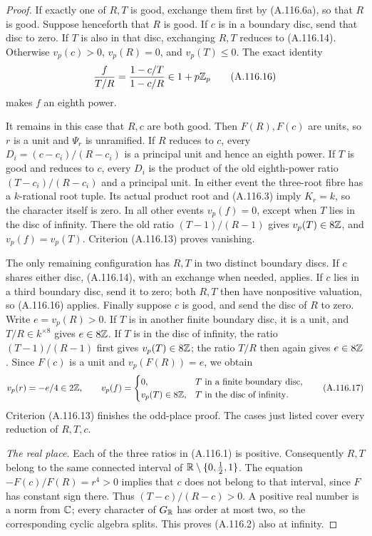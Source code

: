 \begin{proof}
If exactly one of $R,T$ is good, exchange them first
by (A.116.6a), so that $R$ is good.
Suppose henceforth that $R$ is good.
If $c$ is in a boundary disc, send that disc to zero.
If $T$ is also in that disc, exchanging $R,T$
reduces to (A.116.14).
Otherwise $v_p(c)>0$, $v_p(R)=0$, and $v_p(T)\le0$.
The exact identity
\[
                  \frac{f}{T/R}
                   =\frac{1-c/T}{1-c/R}\in1+p\mathbb Z_p
\tag{A.116.16}
\]
makes $f$ an eighth power.

It remains in this case that $R,c$ are both good.
Then $F(R),F(c)$ are units, so $r$ is a unit and
$\Psi_r$ is unramified.
If $R$ reduces to $c$, every
$D_i=(c-c_i)/(R-c_i)$ is a principal unit and hence
an eighth power.
If $T$ is good and reduces to $c$, every $D_i$ is
the product of the old eighth-power ratio
$(T-c_i)/(R-c_i)$ and a principal unit.
In either event the three-root fibre has a
$k$-rational root tuple.
Its actual product root and (A.116.3) imply
$K_r=k$, so the character itself is zero.
In all other events $v_p(f)=0$, except when $T$
lies in the disc of infinity.
There the old ratio $(T-1)/(R-1)$ gives
$v_p(T)\in8\mathbb Z$, and $v_p(f)=v_p(T)$.
Criterion (A.116.13) proves vanishing.

The only remaining configuration has $R,T$ in two
distinct boundary discs.
If $c$ shares either disc, (A.116.14), with an
exchange when needed, applies.
If $c$ lies in a third boundary disc, send it to
zero; both $R,T$ then have nonpositive valuation,
so (A.116.16) applies.
Finally suppose $c$ is good, and send the disc of
$R$ to zero.
Write $e=v_p(R)>0$.
If $T$ is in another finite boundary disc, it is a
unit, and $T/R\in k^{\times8}$ gives $e\in8\mathbb Z$.
If $T$ is in the disc of infinity, the ratio
$(T-1)/(R-1)$ first gives $v_p(T)\in8\mathbb Z$; the
ratio $T/R$ then again gives $e\in8\mathbb Z$.
Since $F(c)$ is a unit and $v_p(F(R))=e$, we obtain
\[
 v_p(r)=-e/4\in2\mathbb Z,\qquad
 v_p(f)=
 \begin{cases}
  0,&T\text{ in a finite boundary disc},\\
  v_p(T)\in8\mathbb Z,&T\text{ in the disc of infinity}.
 \end{cases}
\tag{A.116.17}
\]
Criterion (A.116.13) finishes the odd-place proof.
The cases just listed cover every reduction of
$R,T,c$.

\emph{The real place.}
Each of the three ratios in (A.116.1) is positive.
Consequently $R,T$ belong to the same connected
interval of $\mathbb R\setminus\{0,\tfrac12,1\}$.
The equation $-F(c)/F(R)=r^4>0$ implies that $c$
does not belong to that interval, since $F$ has
constant sign there.
Thus $(T-c)/(R-c)>0$.
A positive real number is a norm from $\mathbb C$;
every character of $G_{\mathbb R}$ has order at most two,
so the corresponding cyclic algebra splits.
This proves (A.116.2) also at infinity.
\end{proof}

